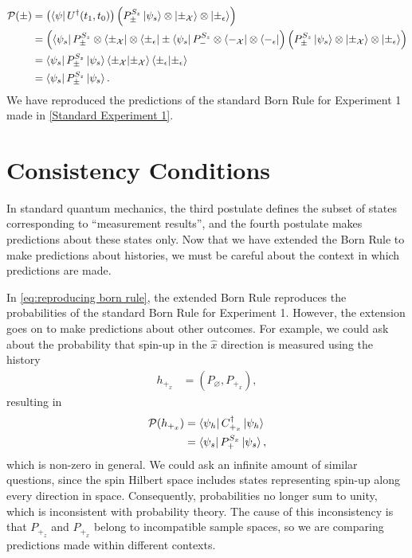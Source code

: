 \begin{align} \label{eq:reproducing born rule}
  \mathcal{P}(\pm) &= \left(\bra{\psi}  U^\dagger(t_1, t_0)\right) \left( P^{S_z}_\pm \ket{\psi_s} \otimes \ket{\pm_\mathcal{X}} \otimes \ket{\pm_\epsilon}\right) \\ \nonumber
   &= \left(\bra{\psi_s}P^{S_z}_\pm \otimes \bra{\pm_\mathcal{X}} \otimes \bra{\pm_\epsilon} \pm \bra{\psi_s}P^{S_z}_- \otimes \bra{-_\mathcal{X}} \otimes \bra{-_\epsilon} \right) \left( P^{S_z}_\pm \ket{\psi_s} \otimes \ket{\pm_\mathcal{X}} \otimes \ket{\pm_\epsilon}\right) \\ \nonumber
   &= \bra{\psi_s} P^{S_z}_\pm \ket{\psi_s} \braket{\pm_\mathcal{X}|\pm_\mathcal{X}} \braket{\pm_\epsilon|\pm_\epsilon} \\ \nonumber
   &= \bra{\psi_s} P^{S_z}_\pm \ket{\psi_s}.
\end{align}
We have reproduced the predictions of the standard Born Rule for Experiment 1 made in \autoref{Standard Experiment 1}.

\section{Consistency Conditions} \label{sec:consistency conditions}

In standard quantum mechanics, the third postulate defines the subset of states corresponding to ``measurement results'', and the fourth postulate makes predictions about these states only. Now that we have extended the Born Rule to make predictions about histories, we must be careful about the context in which predictions are made.

In \autoref{eq:reproducing born rule}, the extended Born Rule reproduces the probabilities of the standard Born Rule for Experiment 1. However, the extension goes on to make predictions about other outcomes. For example, we could ask about the probability that spin-up in the $\hat{x}$ direction is measured using the history
\begin{align}
  h_{+_x} &= (P_\varnothing ,P_{+_x}),
\end{align}
resulting in
\begin{align}
  \mathcal{P}(h_{+_x}) &= \bra{\psi_h} C^\dagger_{+_x} \ket{\psi_h}  \\ \nonumber
  &= \bra{\psi_s} P^{S_x}_+ \ket{\psi_s},
\end{align}
which is non-zero in general. We could ask an infinite amount of similar questions, since the spin Hilbert space includes states representing spin-up along every direction in space. Consequently, probabilities no longer sum to unity, which is inconsistent with probability theory. The cause of this inconsistency is that $P_{+_z}$ and $P_{+_x}$ belong to incompatible sample spaces, so we are comparing predictions made within different contexts.

